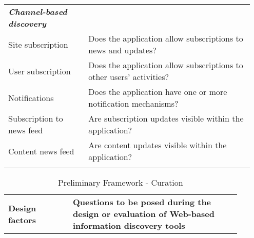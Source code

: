 {\begin{table*}[ht!]
\begin{tabular}{|p{0.31\linewidth}|p{0.64\linewidth}|}
\emph{\textbf{Channel-based discovery}}          &                                                                                                           \\
Site subscription            & Does the application allow subscriptions to news and updates?                                             \\
User subscription             & Does the application allow subscriptions to other users' activities?                                      \\
Notifications                & Does the application have one or more notification mechanisms?                                                      \\
Subscription to news feed                  & Are subscription updates visible within the application?  \\
Content news feed                  & Are content updates visible within the application? \\
&\\
\hline     

         
\end{tabular}
\end{table*}
\pagebreak

\begin{table*}[htbp]
\caption{Preliminary Framework - Curation}
\centering
\label{table:old_framework_curation}
\footnotesize
\begin{tabular}{|p{0.25\linewidth}|p{0.65\linewidth}|}
\hline
\textbf{\small{Design factors}}   & \textbf{\small{Questions to be posed during the design or evaluation of Web-based information discovery tools 
}}  \\


\end{tabular}
\end{table*}}
